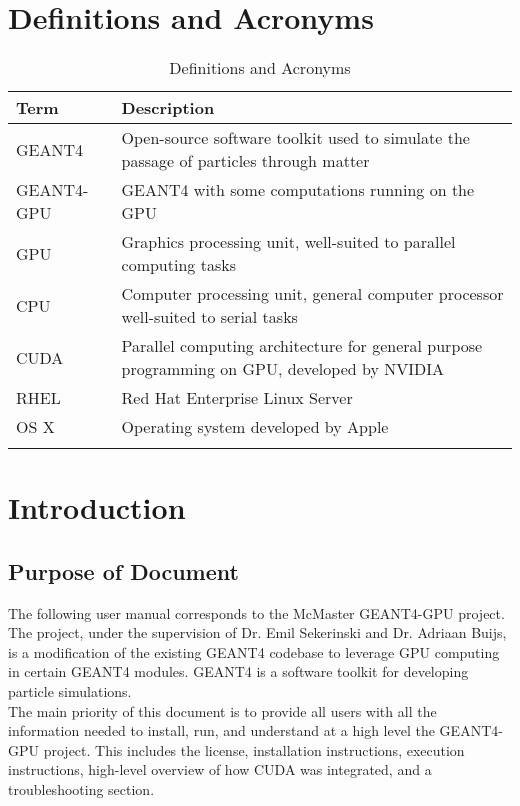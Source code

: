 \documentclass[12pt]{article}
\begin{document}
\section{Definitions and Acronyms} %
\begin{table}[h]
\centering
\caption{Definitions and Acronyms}
\begin{tabularx}{\textwidth}{l|X}
\Xhline{2\arrayrulewidth}
\bf Term & \bf Description\\
\hline
GEANT4 & Open-source software toolkit used to simulate the passage of particles through matter\\\hline
GEANT4-GPU & GEANT4 with some computations running on the GPU\\\hline
GPU & Graphics processing unit, well-suited to parallel computing tasks\\\hline
CPU & Computer processing unit, general computer processor well-suited to serial tasks\\\hline
CUDA & Parallel computing architecture for general purpose programming on GPU, developed by NVIDIA\\\hline
RHEL & Red Hat Enterprise Linux Server\\\hline
OS X & Operating system developed by Apple\\
\Xhline{2\arrayrulewidth}
\end{tabularx}
\end{table}



\section{Introduction} %
\subsection{Purpose of Document} %
The following user manual corresponds to the McMaster GEANT4-GPU project. The project, under the supervision of Dr. Emil Sekerinski and Dr. Adriaan Buijs, is a modification of the existing GEANT4 codebase to leverage GPU computing in certain GEANT4 modules. GEANT4 is a software toolkit for developing particle simulations.\\

The main priority of this document is to provide all users with all the information needed to install, run, and understand at a high level the GEANT4-GPU project. This includes the license, installation instructions, execution instructions, high-level overview of how CUDA was integrated, and a troubleshooting section.\\
\end{document}
